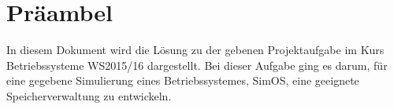 \section{Präambel}
In diesem Dokument wird die Lösung zu der gebenen Projektaufgabe im Kurs Betriebssysteme WS2015/16 dargestellt.
Bei dieser Aufgabe ging es darum, für eine gegebene Simulierung eines Betriebssystemes, SimOS, eine geeignete Speicherverwaltung zu entwickeln. 
